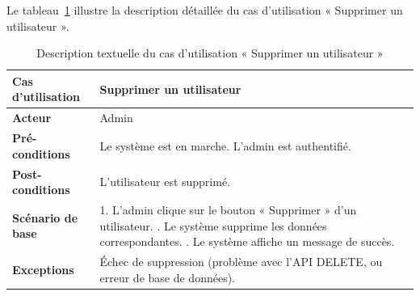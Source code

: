 \newpage
\vspace*{-1.5cm}
Le tableau~\ref{tab:delete_user} illustre la description détaillée du cas d'utilisation « Supprimer un utilisateur ».

\begin{table}[!ht]
\centering
\caption{Description textuelle du cas d’utilisation « Supprimer un utilisateur »}
\label{tab:delete_user}
\renewcommand{\arraystretch}{1.2}
\begin{tabular}{|p{4.2cm}|p{11cm}|}
\hline
\textbf{Cas d'utilisation} & Supprimer un utilisateur \\
\hline
\textbf{Acteur} & Admin \\
\hline
\textbf{Pré-conditions} & Le système est en marche. \newline L’admin est authentifié. \\
\hline
\textbf{Post-conditions} & L'utilisateur est supprimé. \\
\hline
\textbf{Scénario de base} & 
1. L’admin clique sur le bouton « Supprimer » d’un utilisateur. \newline
2. Le système supprime les données correspondantes. \newline
3. Le système affiche un message de succès. \\
\hline
\textbf{Exceptions} & 
Échec de suppression (problème avec l’API DELETE, ou erreur de base de données). \\
\hline
\end{tabular}
\end{table}
